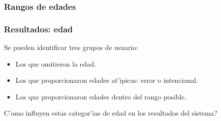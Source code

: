 \documentclass{beamer}
\begin{document}
\begin{frame}[label=edadesposibles]
\frametitle{Rangos de edades}
\begin{figure}[h]
    \begin{center}
    \label{fig:gruposedades}
    \end{center}
\end{figure}
\end{frame}
\begin{frame}[label=analisisedad]
\frametitle{Resultados: edad}
\vspace{-0.2cm}
Se pueden identificar tres grupos de usuario:
\vspace{0.5cm}
\begin{itemize}
    \setlength\itemsep{0.7cm}
    \item Los que omitieron la edad.
    \item Los que proporcionaron edades at'ipicas: error o intencional.
    \item Los que proporcionaron edades dentro del rango posible.
    \end{itemize}  

\vspace{0.5cm} 
\begin{block}{}
\textquestiondown C'omo influyen estas categor'ias de edad en los resultados del sistema?
\end{block}

\end{frame} 
\end{document}
